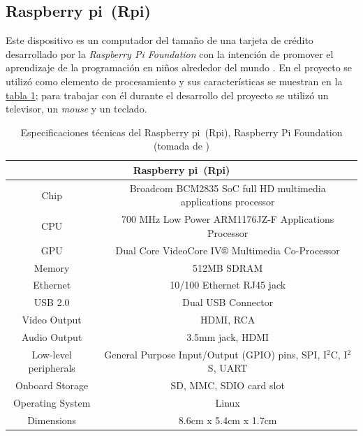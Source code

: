 \documentclass[11pt,lettersize]{article} %
\newcommand{\tabla}[1]{\hyperref[{#1}]{tabla \ref*{#1}}}
\begin{document}
\subsection{Raspberry pi\textregistered\ (Rpi)}
Este dispositivo es un computador del tamaño de una tarjeta de crédito desarrollado por la \emph{Raspberry Pi Foundation} con la intención de promover el aprendizaje de la programación en niños alrededor del mundo \cite{Raspberry}. En el proyecto se utilizó como elemento de procesamiento y sus características se muestran en la \tabla{T-rpi}; para trabajar con él durante el desarrollo del proyecto se utilizó un televisor, un \textit{mouse} y un teclado.
\begin{table}[H]
	\begin{center}
		\begin{tabular}{|c|c|}
			\hline
			\multicolumn{2}{|c|}{Raspberry pi\textregistered\ (Rpi)}\\ \hline
			Chip & Broadcom BCM2835 SoC full HD multimedia applications processor\\ \hline
			CPU & 700 MHz Low Power ARM1176JZ-F Applications Processor\\ \hline
			GPU & Dual Core VideoCore IV® Multimedia Co-Processor\\ \hline
			Memory & 512MB SDRAM\\ \hline
			Ethernet & 10/100 Ethernet RJ45 jack\\ \hline
			USB 2.0 & Dual USB Connector\\ \hline
			Video Output & HDMI, RCA\\ \hline
			Audio Output & 3.5mm jack, HDMI\\ \hline
			Low-level peripherals & \nomenclature{GPIO}{Entradas y salidas de propósito general, por sus siglas en inglés}General Purpose Input/Output (GPIO) pins, SPI, I$^2$C, I$^2$S, UART\\ \hline
			Onboard Storage & SD, MMC, SDIO card slot\\ \hline
			Operating System & Linux\\ \hline
			Dimensions & 8.6cm x 5.4cm x 1.7cm\\ \hline
		\end{tabular}
	\end{center}
	\caption[Especificaciones técnicas del Raspberry pi\textregistered\ (Rpi)]{Especificaciones técnicas del Raspberry pi\textregistered\ (Rpi), Raspberry Pi Foundation (tomada de \cite{ElinuxHardware})}
	\label{T-rpi}
\end{table}
\end{document}
